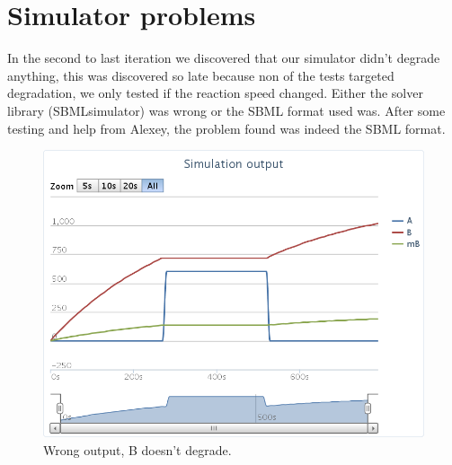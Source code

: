 \documentclass[a4paper]{article}
\begin{document}
\section*{Simulator problems}
In the second to last iteration we discovered that our simulator didn't degrade anything, this was discovered so late because non of the tests targeted degradation, we only tested if the reaction speed changed. Either the solver library (SBMLsimulator) was wrong or the SBML format used was. After some testing and help from Alexey, the problem found was indeed the SBML format.\\

\begin{figure}[h!]
	\centering\includegraphics[scale=0.35]{../../screenshots/2012-05-31-not-output.png}
	\caption{Wrong output, B doesn't degrade.}
\end{figure}
\end{document}
